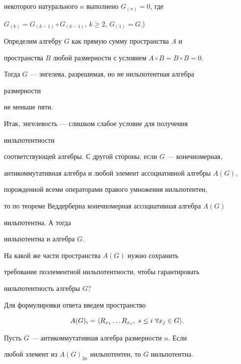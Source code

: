 некоторого натурального $n$ выполнено $G_{(n)}=0$, где 


$G_{(k)}=G_{(k-1)}\circ G_{(k-1)}$, $k\ge2$, $G_{(1)}=G$.) 


Определим алгебру $G$ как прямую сумму пространства $A$ и 


пространства $B$ любой размерности с условием $A\circ B=B\circ B=0$. 


Тогда $G$ --- энгелева, разрешимая, но не нильпотентная алгебра 


размерности 


не меньше пяти. 


 


Итак, энгелевость --- слишком слабое условие для получения 


нильпотентности 


соответствующей алгебры. С другой стороны, если $G$ --- конечномерная, 


антикоммутативная алгебра и любой элемент ассоциативной алгебры $A(G)$, 


порожденной всеми операторами правого умножения нильпотентен, 


то по теореме Веддерберна конечномерная ассоциативная алгебра $A(G)$ 


нильпотентна. А тогда 


нильпотентна и алгебра $G$. 


На какой же части пространства $A(G)$ нужно сохранить 


требование поэлементной нильпотентности, чтобы гарантировать 


нильпотентность алгебры $G$? 


Для формулировки ответа введем пространство 


$$ 


A(G)_i=\la R_{x_1}\dotsc R_{x_s},\ s\le i\ \forall x_j\in G\ra. 


$$ 


 


\begin{thm} 


Пусть $G$ --- антикоммутативная алгебра размерности $n$. Если 


любой элемент из $A(G)_{2n}$ нильпотентен, то $G$ нильпотентна. 


\end{thm} 


 



